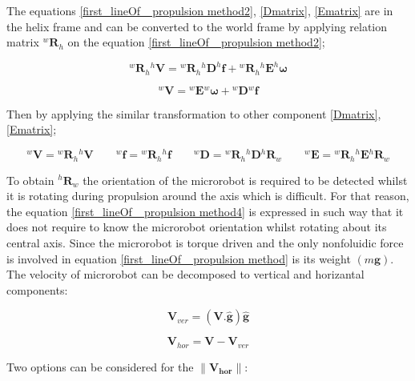 \documentclass[12pt,a4paper,titlepage]{report}
\begin{document}
The equations \ref{first_lineOf_ propulsion method2}, \ref{Dmatrix}, \ref{Ematrix} are in the helix frame and 
can be converted to the world frame by applying relation matrix $^{w}\bm{R}_h$ on the equation
\ref{first_lineOf_ propulsion method2};


\begin{equation}
{^{w}\bm{R}_h}{^{h}\bm{V} } = {^{w}\bm{R}_h}{ ^{h}\bm{D} ^{h}\bm{f}} + {^{w}\bm{R}_h}{^{h}\bm{E} ^{h}\bm{\omega}}
\label{first_lineOf_ propulsion method3}  
\end{equation}



\begin{equation}
^{w}\bm{V}  ={^{w}\bm{E}} {^{w}\bm{\omega}} + {^{w}\bm{D}} {^{w}\bm{f}}  
\label{first_lineOf_ propulsion method4}  
\end{equation}

Then by applying the similar transformation to other component \ref{Dmatrix}, \ref{Ematrix};

\begin{equation}
^{w}\bm{V}  = {^{w}\bm{R}_h}{^{h}\bm{V}}  \qquad  ^{w}\bm{f}  = {^{w}\bm{R}_h}{^{h}\bm{f}}
\qquad  ^{w}\bm{D}  = {^{w}\bm{R}_h}{^{h}\bm{D}} {^{h}\bm{R}_w}
\qquad  ^{w}\bm{E}  = {^{w}\bm{R}_h}{^{h}\bm{E}} {^{h}\bm{R}_w}
\label{first_lineOf_ propulsion method5}  
\end{equation}

 To obtain ${^{h}\bm{R}_w}$ the orientation of the microrobot is required to be detected 
whilst it is rotating during propulsion around the axis which is difficult. For that reason, the equation
\ref{first_lineOf_ propulsion method4} is expressed in such way that it does not require to know the
microrobot orientation whilst rotating about its central axis. Since the microrobot is torque driven and the only 
nonfoluidic force is involved in equation \ref{first_lineOf_ propulsion method} is its weight $(m \bm{g})$. The 
velocity of microrobot can be decomposed to vertical and horizantal components:

 \begin{equation}
\bm{V}_{ver} = (\bm{V . \hat{g}})\bm{\hat {g}}
\label{vertical_velo}
\end{equation}


\begin{equation}
\bm{V}_{hor} = \bm{V} - \bm{V}_{ver}  
\label{horiantal_velo}
\end{equation}

Two options can be considered for the ${\| \bm {{V}_{hor}}\|}$:
\end{document}
